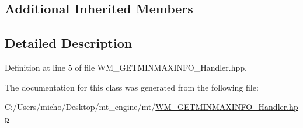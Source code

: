 \subsection*{Additional Inherited Members}


\subsection{Detailed Description}


Definition at line 5 of file W\+M\+\_\+\+G\+E\+T\+M\+I\+N\+M\+A\+X\+I\+N\+F\+O\+\_\+\+Handler.\+hpp.



The documentation for this class was generated from the following file\+:\begin{DoxyCompactItemize}
\item 
C\+:/\+Users/micho/\+Desktop/mt\+\_\+engine/mt/\hyperlink{_w_m___g_e_t_m_i_n_m_a_x_i_n_f_o___handler_8hpp}{W\+M\+\_\+\+G\+E\+T\+M\+I\+N\+M\+A\+X\+I\+N\+F\+O\+\_\+\+Handler.\+hpp}\end{DoxyCompactItemize}
